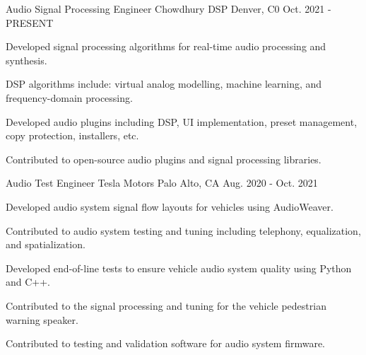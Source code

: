 

\begin{cventries}

  \cventry
    {Audio Signal Processing Engineer} %
    {Chowdhury DSP} %
    {Denver, C0} %
    {Oct. 2021 - PRESENT} %
    {
      \begin{cvitems} %
        \item {Developed signal processing algorithms for real-time audio processing and synthesis.}
        \item {DSP algorithms include: virtual analog modelling, machine learning, and frequency-domain processing.}
        \item {Developed audio plugins including DSP, UI implementation, preset management, copy protection, installers, etc.}
        \item {Contributed to open-source audio plugins and signal processing libraries.}
      \end{cvitems}
    }

  \cventry
    {Audio Test Engineer} %
    {Tesla Motors} %
    {Palo Alto, CA} %
    {Aug. 2020 - Oct. 2021} %
    {
      \begin{cvitems} %
        \item {Developed audio system signal flow layouts for vehicles using AudioWeaver.}
        \item {Contributed to audio system testing and tuning including telephony, equalization, and spatialization.}
        \item {Developed end-of-line tests to ensure vehicle audio system quality using Python and C++.}
        \item {Contributed to the signal processing and tuning for the vehicle pedestrian warning speaker.}
        \item {Contributed to testing and validation software for audio system firmware.}
      \end{cvitems}
    }


\end{cventries}
